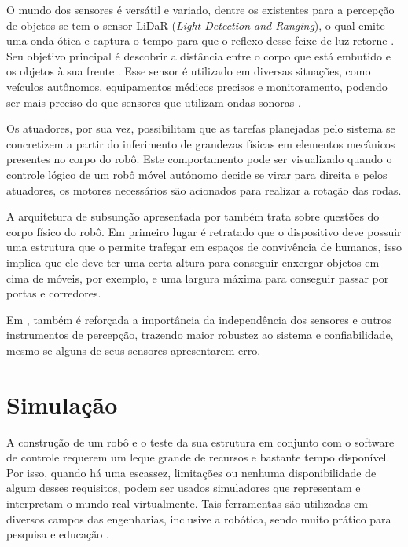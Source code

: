 O mundo dos sensores  é versátil e variado, dentre os existentes para a percepção de objetos se tem o sensor LiDaR (\textit{Light Detection and Ranging}), o qual emite uma onda ótica e captura o tempo para que o reflexo desse feixe de luz retorne \cite{lidarComparative:2021, lidarProgress:2022}. Seu objetivo principal é descobrir a distância entre o corpo que está embutido e os objetos à sua frente \cite{lidarProgress:2022, lidarComparative:2021}. Esse sensor é utilizado em diversas situações, como veículos autônomos, equipamentos médicos precisos e monitoramento, podendo ser mais preciso do que sensores que utilizam ondas sonoras \cite{lidarProgress:2022, lidarDetection:2019}.

Os atuadores, por sua vez, possibilitam que as tarefas planejadas pelo sistema se concretizem a partir do inferimento de grandezas físicas em elementos mecânicos presentes no corpo do robô. Este comportamento pode ser visualizado quando o controle lógico de um robô móvel autônomo decide se virar para direita e pelos atuadores, os motores necessários são acionados para realizar a rotação das rodas.  

A arquitetura de subsunção apresentada por \citet{brooks85} também trata sobre questões do corpo físico do robô. Em primeiro lugar é retratado que o dispositivo deve possuir uma estrutura que o permite trafegar em espaços de convivência de humanos, isso implica que ele deve ter uma certa altura para conseguir enxergar objetos em cima de móveis, por exemplo, e uma largura máxima para conseguir passar por portas e corredores. 

Em \citet{brooks85}, também é reforçada a importância da independência dos sensores e outros instrumentos de percepção, trazendo maior robustez ao sistema e confiabilidade, mesmo se alguns de seus sensores apresentarem erro. 

\section{Simulação} %

A construção de um robô e o teste da sua estrutura em conjunto com o software de controle requerem um leque grande de recursos e bastante tempo disponível. Por isso, quando há uma escassez, limitações ou nenhuma disponibilidade de algum desses requisitos, podem ser usados simuladores que representam e interpretam o mundo real virtualmente. 
Tais ferramentas são utilizadas em diversos campos das engenharias, inclusive a robótica, sendo muito prático para pesquisa e educação \cite{usarsimCarpin:2007}. 

